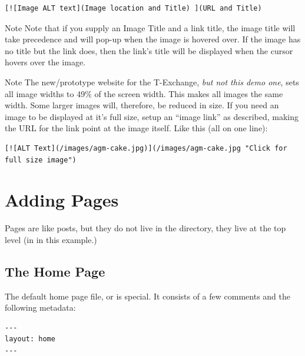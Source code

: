 \begin{lstlisting}[style=myText]
[![Image ALT text](Image location and Title) ](URL and Title)
\end{lstlisting}

\begin{tips}{Note}
    Note that if you supply an Image Title and a link title, the image title will take precedence and will pop-up when the image is hovered over. If the image has no title but the link does, then the link's title will be displayed when the cursor hovers over the image.
\end{tips}

\begin{tips}{Note}
    The new/prototype website for the T-Exchange, \emph{but not this demo one}, sets all image widths to 49\% of the screen width. This makes all images the same width. Some larger images will, therefore, be reduced in size. If you need an image to be displayed at it's full size, setup an ``image link'' as described, making the URL for the link point at the image itself. Like this (all on one line):

    \begin{lstlisting}[style=myText]
[![ALT Text](/images/agm-cake.jpg)](/images/agm-cake.jpg "Click for full size image")\end{lstlisting}%
\end{tips}



\section{Adding Pages}\label{sect: Adding Pages}

Pages are like posts, but they do not live in the  directory, they live at the top level (in  in this example.)



\subsection{The Home Page}\label{sect: The Home Page}

The default home page file,  or  is special. It consists of a few comments and the following metadata:

\begin{lstlisting}[caption={Metadata for the ``home'' page's file},style=myText]
---
layout: home
---
\end{lstlisting}

